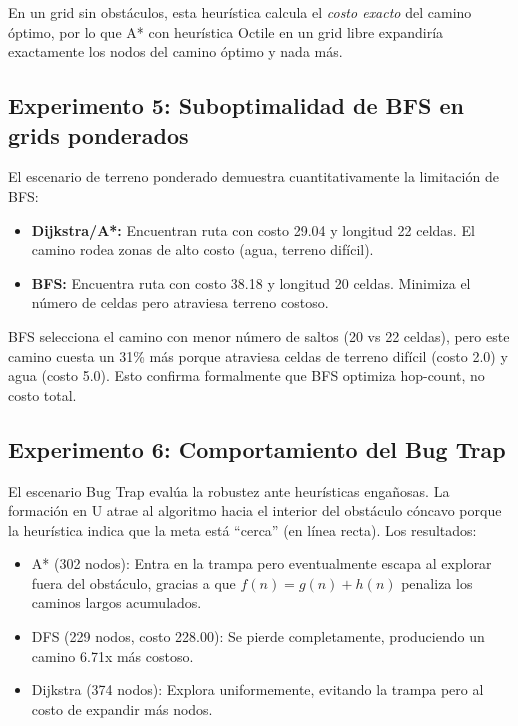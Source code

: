 En un grid sin obstáculos, esta heurística calcula el \textit{costo exacto} del camino óptimo, por lo que A* con heurística Octile en un grid libre expandiría exactamente los nodos del camino óptimo y nada más.

\subsection{Experimento 5: Suboptimalidad de BFS en grids ponderados}

El escenario de terreno ponderado demuestra cuantitativamente la limitación de BFS:

\begin{itemize}
    \item \textbf{Dijkstra/A*:} Encuentran ruta con costo 29.04 y longitud 22 celdas. El camino rodea zonas de alto costo (agua, terreno difícil).
    \item \textbf{BFS:} Encuentra ruta con costo 38.18 y longitud 20 celdas. Minimiza el número de celdas pero atraviesa terreno costoso.
\end{itemize}

BFS selecciona el camino con menor número de saltos (20 vs 22 celdas), pero este camino cuesta un 31\% más porque atraviesa celdas de terreno difícil (costo 2.0) y agua (costo 5.0). Esto confirma formalmente que BFS optimiza hop-count, no costo total.

\subsection{Experimento 6: Comportamiento del Bug Trap}

El escenario Bug Trap evalúa la robustez ante heurísticas engañosas. La formación en U atrae al algoritmo hacia el interior del obstáculo cóncavo porque la heurística indica que la meta está ``cerca'' (en línea recta). Los resultados:

\begin{itemize}
    \item A* (302 nodos): Entra en la trampa pero eventualmente escapa al explorar fuera del obstáculo, gracias a que $f(n) = g(n) + h(n)$ penaliza los caminos largos acumulados.
    \item DFS (229 nodos, costo 228.00): Se pierde completamente, produciendo un camino 6.71x más costoso.
    \item Dijkstra (374 nodos): Explora uniformemente, evitando la trampa pero al costo de expandir más nodos.
\end{itemize}

